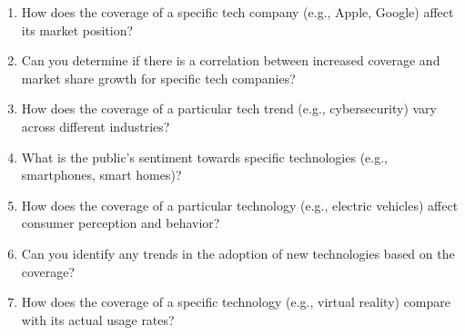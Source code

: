 \begin{footnotesize}
\begin{enumerate}[label={\(q_{\arabic*}\).},start=0]
\item How does the coverage of a specific tech company (e.g., Apple, Google) affect its market position?
\item Can you determine if there is a correlation between increased coverage and market share growth for specific tech companies?
\item How does the coverage of a particular tech trend (e.g., cybersecurity) vary across different industries?
\item What is the public's sentiment towards specific technologies (e.g., smartphones, smart homes)?
\item How does the coverage of a particular technology (e.g., electric vehicles) affect consumer perception and behavior?
\item Can you identify any trends in the adoption of new technologies based on the coverage?
\item How does the coverage of a specific technology (e.g., virtual reality) compare with its actual usage rates?
\end{enumerate}
\end{footnotesize}


